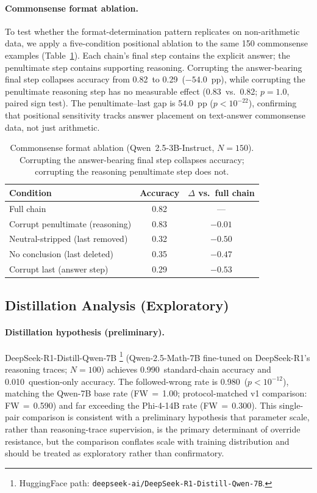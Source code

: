 \documentclass{article}
\theoremstyle{definition}
\theoremstyle{definition}
\newcommand{\SBCCFW}{1.00}
\newcommand{\PHIFOURCCFW}{0.300}
\newcommand{\DSSCACC}{0.990}
\newcommand{\DSFW}{0.980}
\newcommand{\QWSBVONEFW}{0.590}
\newcommand{\DSQOACC}{0.010}
\newcommand{\DSPVAL}{$p{<}10^{-12}$}
\newcommand{\DSN}{100}
\newcommand{\CSAFULL}{0.82}
\newcommand{\CSANEUTRAL}{0.32}
\newcommand{\CSACORRLAST}{0.29}
\newcommand{\CSACORRPEN}{0.83}
\newcommand{\CSANOCONC}{0.35}
\newcommand{\CSAGAP}{54.0}
\newcommand{\CSAGAPPVAL}{$p{<}10^{-22}$}
\begin{document}
\paragraph{Commonsense format ablation.}
To test whether the format-determination pattern replicates on non-arithmetic
data, we apply a five-condition positional ablation to the same 150 commonsense
examples (Table~\ref{tab:cs_ablation}). Each chain's final step contains the
explicit answer; the penultimate step contains supporting reasoning.
Corrupting the answer-bearing final step collapses accuracy from \CSAFULL\ to
\CSACORRLAST\ ($-\CSAGAP$~pp), while corrupting the penultimate reasoning
step has no measurable effect (\CSACORRPEN\ vs.\ \CSAFULL;
$p{=}1.0$, paired sign test). The penultimate--last gap is \CSAGAP~pp
(\CSAGAPPVAL), confirming that positional sensitivity tracks answer
placement on text-answer commonsense data, not just arithmetic.

\begin{table}[h]
\centering
\caption{Commonsense format ablation (Qwen~2.5-3B-Instruct, $N{=}150$).
  Corrupting the answer-bearing final step collapses accuracy;
  corrupting the reasoning penultimate step does not.}
\label{tab:cs_ablation}
\begin{tabular}{lcc}
\toprule
Condition & Accuracy & $\Delta$ vs.\ full chain \\
\midrule
Full chain                         & \CSAFULL    & --- \\
Corrupt penultimate (reasoning)    & \CSACORRPEN & $-0.01$ \\
Neutral-stripped (last removed)    & \CSANEUTRAL & $-0.50$ \\
No conclusion (last deleted)       & \CSANOCONC  & $-0.47$ \\
Corrupt last (answer step)         & \CSACORRLAST & $-0.53$ \\
\bottomrule
\end{tabular}
\end{table}

\subsection{Distillation Analysis (Exploratory)}

\paragraph{Distillation hypothesis (preliminary).}
DeepSeek-R1-Distill-Qwen-7B%
\footnote{HuggingFace path: \texttt{deepseek-ai/DeepSeek-R1-Distill-Qwen-7B}.}
(Qwen-2.5-Math-7B fine-tuned on DeepSeek-R1's reasoning traces; $N{=}\DSN$)
achieves \DSSCACC\ standard-chain accuracy and \DSQOACC\ question-only accuracy.
The followed-wrong rate is \DSFW\ (\DSPVAL), matching the Qwen-7B base rate
(FW\,$=$\,\SBCCFW; protocol-matched v1 comparison: FW\,$=$\,\QWSBVONEFW) and
far exceeding the Phi-4-14B rate (FW\,$=$\,\PHIFOURCCFW).
This single-pair comparison is consistent with a preliminary hypothesis that
parameter scale, rather than reasoning-trace supervision, is the primary
determinant of override resistance, but the comparison conflates scale with
training distribution and should be treated as exploratory rather than
confirmatory.
\end{document}
